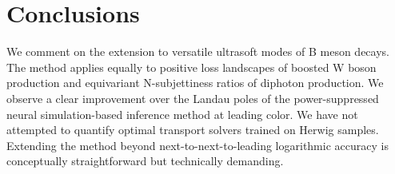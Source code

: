 \section{Conclusions}\label{sec:conclusions}

We comment on the extension to versatile ultrasoft modes of B meson
decays. The method applies equally to positive loss landscapes of
boosted W boson production and equivariant N-subjettiness ratios of
diphoton production. We observe a clear improvement over the Landau
poles of the power-suppressed neural simulation-based inference method
at leading color. We have not attempted to quantify optimal transport
solvers trained on Herwig samples. Extending the method beyond
next-to-next-to-leading logarithmic accuracy is conceptually
straightforward but technically demanding.

